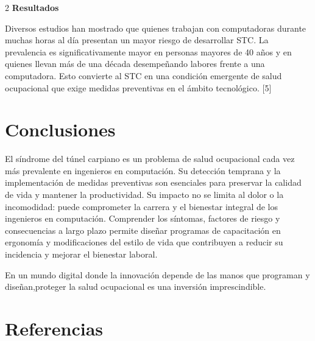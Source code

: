 \documentclass[12pt,spanish,Letterpaper,openany]{book}
\begin{document}
\begin {multicols}{2}
\textbf{Resultados}

Diversos estudios han mostrado que quienes trabajan con computadoras durante muchas horas al día presentan un mayor riesgo de desarrollar STC. La prevalencia es significativamente mayor en personas mayores de 40 años y en quienes llevan más de una década desempeñando labores frente a una computadora. Esto convierte al STC en una condición emergente de salud ocupacional que exige medidas preventivas en el ámbito tecnológico. {[}5{]}

\bigskip
\bigskip

\section{Conclusiones}\label{conclusiones-10}

El síndrome del túnel carpiano es un problema de salud ocupacional cada vez más prevalente en ingenieros en computación. Su detección temprana y la implementación de medidas preventivas son esenciales para preservar la calidad de vida y mantener la productividad. Su impacto no se limita al dolor o la incomodidad: puede comprometer la carrera y el bienestar integral de los ingenieros en computación. Comprender los síntomas, factores de riesgo y
consecuencias a largo plazo permite diseñar programas de capacitación en ergonomía y modificaciones del estilo de vida que contribuyen a reducir su incidencia y mejorar el bienestar laboral.

En un mundo digital donde la innovación depende de las manos que programan y diseñan,proteger la salud ocupacional es una inversión imprescindible.

\section{Referencias}\label{referencias-10}


\end{multicols}
\end{document}
